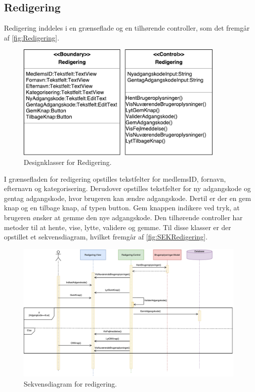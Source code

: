 \subsection*{Redigering}
Redigering inddeles i en grænseflade og en tilhørende controller, som det fremgår af \autoref{fig:Redigering}. 

\begin{figure} [H]
\centering
\includegraphics[width=0.9\textwidth]{figures/MVC/Redigering}
\caption{Designklasser for Redigering.}
\label{fig:Redigering}
\end{figure}

\noindent
I grænsefladen for redigering opstilles tekstfelter for medlemsID, fornavn, efternavn og kategorisering. Derudover opstilles tekstfelter for ny adgangskode og gentag adgangskode, hvor brugeren kan ændre adgangskode. Dertil er der en gem knap og en tilbage knap, af typen button. Gem knappen indikere ved tryk, at brugeren ønsker at gemme den nye adgangskode. 
Den tilhørende controller har metoder til at hente, vise, lytte, validere og gemme. Til disse klasser er der opstillet et sekvensdiagram, hvilket fremgår af \autoref{fig:SEKRedigering}.


\begin{figure} [H]
\centering
\includegraphics[width=1\textwidth]{figures/Sek/SEKRedigering}
\caption{Sekvensdiagram for redigering.}
\label{fig:SEKRedigering}
\end{figure}

